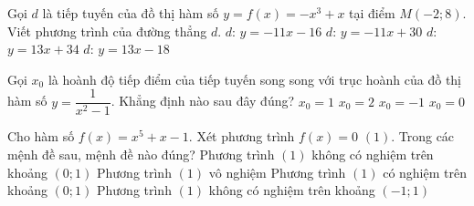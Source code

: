 \begin{ex}%
	Gọi $d$ là tiếp tuyến của đồ thị hàm số $y=f(x)=-x^3+x$ tại điểm $M(-2;8)$. Viết phương trình của đường thẳng $d$.
	\choice
	{\True $d$: $y=-11x-16$}
	{$d$: $y=-11x+30$}
	{$d$: $y=13x+34$}
	{$d$: $y=13x-18$}
\end{ex}

\begin{ex}%
	Gọi $x_0$ là hoành độ tiếp điểm của tiếp tuyến song song với trục hoành của đồ thị hàm số $y=\dfrac{1}{x^2-1}$. Khẳng định nào sau đây đúng?
	\choice
	{$x_0=1$}
	{$x_0=2$}
	{$x_0=-1$}
	{\True $x_0=0$}
\end{ex}

\begin{ex}%
	Cho hàm số $f(x)=x^5+x-1$. Xét phương trình $f(x)=0$ $(1)$. Trong các mệnh đề sau, mệnh đề nào đúng?
	\choice
	{Phương trình $(1)$ không có nghiệm trên khoảng $(0;1)$} 
	{Phương trình $(1)$ vô nghiệm} 
	{\True Phương trình $(1)$ có nghiệm trên khoảng $(0;1)$} 
	{Phương trình $(1)$ không có nghiệm trên khoảng $(-1;1)$} 
\end{ex}


